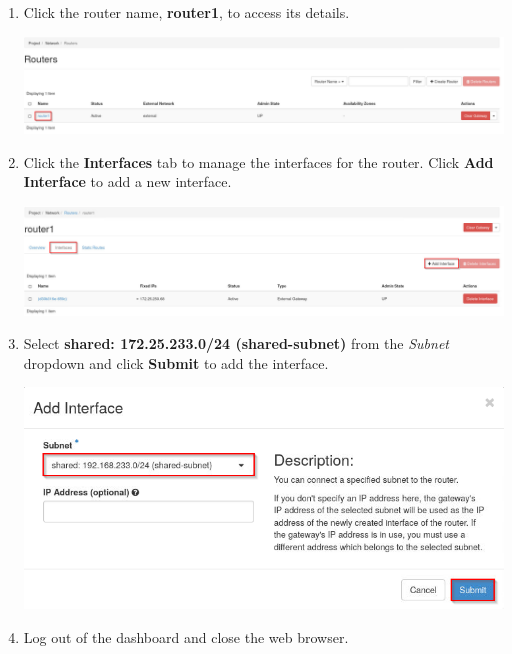 \documentclass[letterpaper, 12pt]{article}
\begin{document}
\begin{enumerate}
    \item Click the router name, \textbf{router1}, to access its details.
    
    \begin{center}
        \includegraphics[width=\linewidth]{images/part2/step4.png}
    \end{center}

    \item Click the \textbf{Interfaces} tab to manage the interfaces for the router. Click \textbf{Add Interface} to add
    a new interface.

    \begin{center}
        \includegraphics[width=\linewidth]{images/part2/step5.png}
    \end{center}

    \item Select \textbf{shared: 172.25.233.0/24 (shared-subnet)} from the \textit{Subnet} dropdown and click
    \textbf{Submit} to add the interface.

    \begin{center}
        \includegraphics[width=\linewidth]{images/part2/step6.png}
    \end{center}

    \item Log out of the dashboard and close the web browser.
    

\end{enumerate}
\end{document}
